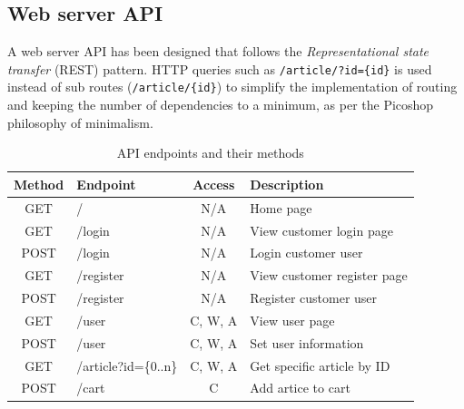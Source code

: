 \documentclass{article}
\begin{document}
\subsection{Web server API}
A web server API has been designed that follows the \emph{Representational state transfer} (REST) pattern. HTTP queries such as \texttt{/article/?id=\{id\}} is used instead of sub routes (\texttt{/article/\{id\}}) to simplify the implementation of routing and keeping the number of dependencies to a minimum, as per the Picoshop philosophy of minimalism. 
\begin{table}[H]
\centering
\caption{API endpoints and their methods}
\begin{tabular}{|clcl|}
\hline
\textbf{Method}              & \textbf{Endpoint}                             & \textbf{Access}              & \textbf{Description}                 \\ \hline
\multicolumn{1}{|c|}{GET}    & \multicolumn{1}{l|}{/}                        & \multicolumn{1}{c|}{N/A}     & Home page                            \\
\multicolumn{1}{|c|}{GET}    & \multicolumn{1}{l|}{/login}                   & \multicolumn{1}{c|}{N/A}     & View customer login page                      \\
\multicolumn{1}{|c|}{POST}   & \multicolumn{1}{l|}{/login}                   & \multicolumn{1}{c|}{N/A}     & Login customer user                           \\
\multicolumn{1}{|c|}{GET}    & \multicolumn{1}{l|}{/register}                & \multicolumn{1}{c|}{N/A}     & View customer register page                   \\
\multicolumn{1}{|c|}{POST}   & \multicolumn{1}{l|}{/register}                & \multicolumn{1}{c|}{N/A}     & Register customer user                        \\
\multicolumn{1}{|c|}{GET}    & \multicolumn{1}{l|}{/user}                    & \multicolumn{1}{c|}{C, W, A} & View user page                       \\
\multicolumn{1}{|c|}{POST}   & \multicolumn{1}{l|}{/user}                    & \multicolumn{1}{c|}{C, W, A} & Set user information                 \\
\multicolumn{1}{|c|}{GET}    & \multicolumn{1}{l|}{/article?id=\{0..n\}}     & \multicolumn{1}{c|}{C, W, A} & Get specific article by ID           \\
\multicolumn{1}{|c|}{POST}   & \multicolumn{1}{l|}{/cart}                    & \multicolumn{1}{c|}{C}       & Add artice to cart                   \\

\end{tabular}
\end{table}
\end{document}

